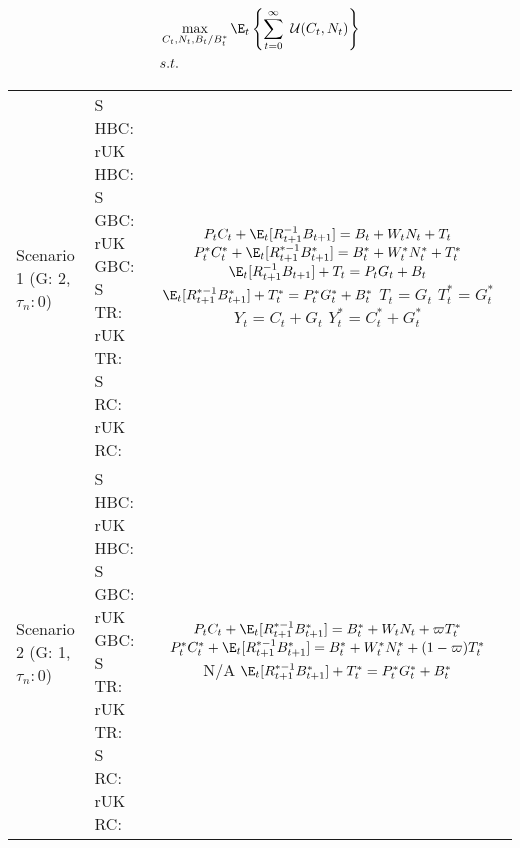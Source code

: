 \begin{align}
    &\max\limits_{C_t, N_t, B_t/B^*_t} \E_t \left\{\sum^{\infty}_{t=0} \  \mathcal{U}(C_t, N_t)\right\} \\
&s.t. \nonumber
\end{align}
\renewcommand{\arraystretch}{8}
\begin{table}[H]
    \centering
    \begin{tabular}{l|l c}
    \makecell{Scenario 1 \\ (G: 2, $\tau_n: 0$)} &  \makecell{S HBC: \\ rUK HBC: \\ S GBC: \\ rUK GBC: \\ S TR: \\ rUK TR: \\ S RC: \\ rUK RC:} & 
        \makecell{
            $P_t C_t + \E_t [{R^{-1}_{t+1}}B_{t+1}] = B_t + W_t N_t + T_t$ \\
            $P^*_t C^*_t + \E_t [{R^{*-1}_{t+1}}B^*_{t+1}] = B^*_t + W^*_t N^*_t + T^*_t$ \\
            $\E_t [{R^{-1}_{t+1}}B_{t+1}] + T_t = P_tG_t + B_t$\\
            $\E_t [{R^{*-1}_{t+1}}B^*_{t+1}] + T^*_t = P^*_tG^*_t + B^*_t$ \\
            $T_t = G_t$ \\
            $T^*_t = G^*_t$ \\
            $Y_t = C_t + G_t$ \\
            $Y^*_t = C^*_t + G^*_t$
        }  \\ 
    \makecell{Scenario 2 \\ (G: 1, $\tau_n: 0$)} &  \makecell{S HBC: \\ rUK HBC: \\ S GBC: \\ rUK GBC: \\ S TR: \\ rUK TR: \\ S RC: \\ rUK RC:} & 
        \makecell{
            $P_t C_t + \E_t [{R^{*-1}_{t+1}}B^*_{t+1}] = B^*_t + W_t N_t + \varpi T^*_t$ \\
            $P^*_t C^*_t + \E_t [{R^{*-1}_{t+1}}B^*_{t+1}] = B^*_t + W^*_t N^*_t + (1-\varpi)T^*_t$ \\
            N/A\\
            $\E_t [{R^{*-1}_{t+1}}B^*_{t+1}] + T^*_t = P^*_tG^*_t + B^*_t$\\
}
\end{tabular}
\end{table}
